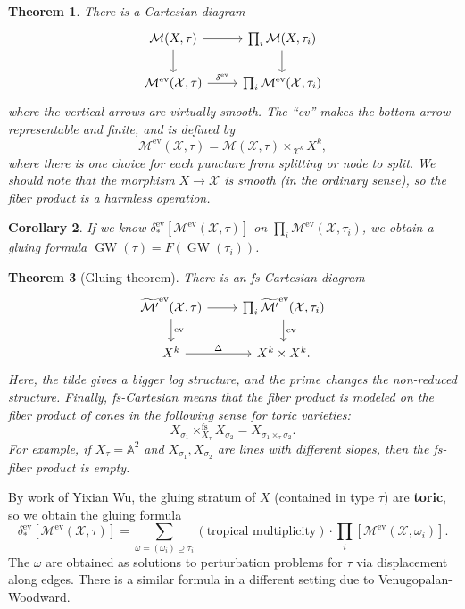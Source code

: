 \documentclass[leqno, openany]{memoir}
\newtheorem{thm}{Theorem}[section]
\newtheorem{cor}[thm]{Corollary}
\theoremstyle{definition}
\theoremstyle{remark}
\theoremstyle{plain}
\theoremstyle{definition}
\theoremstyle{remark}
\newcommand{\A}{\mathbb{A}}
\newcommand{\mc}[1]{\mathcal{#1}}
\newcommand{\mr}[1]{\mathrm{#1}}
\newcommand{\on}[1]{\operatorname{#1}}
\newcommand{\wt}[1]{\widetilde{#1}}
\begin{document}
\begin{thm}
  There is a Cartesian diagram
  \begin{equation*}
    \begin{tikzcd}
      \mc{M}(X, \tau) \ar{r} \ar{d} & \prod_i \mc{M}(X, \tau_i) \ar{d} \\
      \mc{M}^{\mr{ev}}(\mc{X}, \tau) \ar{r}{\delta^{\mr{ev}}} & \prod_i \mc{M}^{\mr{ev}}(\mc{X}, \tau_i)
    \end{tikzcd}
  \end{equation*}
  where the vertical arrows are virtually smooth. The ``ev'' makes the bottom arrow representable and finite, and is defined by
  \[ \mc{M}^{\mr{ev}}(\mc{X}, \tau) = \mc{M}(\mc{X}, \tau) \times_{\mc{X}^k} X^k, \]
  where there is one choice for each puncture from splitting or node to split. We should note that the morphism $X \to \mc{X}$ is smooth (in the ordinary sense), so the fiber product is a harmless operation.
\end{thm}

\begin{cor}
If we know $\delta^{\mr{ev}}_* [\mc{M}^{\mr{ev}}(\mc{X}, \tau)]$ on $\prod_i \mc{M}^{\mr{ev}}(\mc{X}, \tau_i)$, we obtain a gluing formula $\on{GW}(\tau) = F(\on{GW}(\tau_i))$.
\end{cor}

\begin{thm}[Gluing theorem]
  There is an fs-Cartesian diagram
  \begin{equation*}
    \begin{tikzcd}
      \wt{\mc{M}'}^{\mr{ev}}(\mc{X}, \tau) \ar{r} \ar{d}{\mr{ev}} & \prod_i \wt{\mc{M}'}^{\mr{ev}}(\mc{X}, \tau_i) \ar{d}{\mr{ev}} \\
      X^k \ar{r}{\Delta} & X^k \times X^k.
    \end{tikzcd}
  \end{equation*}
  Here, the tilde gives a bigger log structure, and the prime changes the non-reduced structure. Finally, fs-Cartesian means that the fiber product is modeled on the fiber product of cones in the following sense for toric varieties:
  \[ X_{\sigma_1} \times^{\mr{fs}}_{X_{\tau}} X_{\sigma_2} = X_{\sigma_1 \times_{\tau} \sigma_2}. \]
  For example, if $X_{\tau} = \A^2$ and $X_{\sigma_1}, X_{\sigma_2}$ are lines with different slopes, then the fs-fiber product is empty.
\end{thm}

By work of Yixian Wu, the gluing stratum of $X$ (contained in type $\tau$) are \textbf{toric}, so we obtain the gluing formula
\[ \delta_*^{\mr{ev}}[\mc{M}^{\mr{ev}}(\mc{X}, \tau)] = \sum_{\omega = (\omega_i) \supseteq \tau_i} (\text{tropical multiplicity}) \cdot \prod_i [\mc{M}^{\mr{ev}}(\mc{X}, \omega_i)]. \]
The $\omega$ are obtained as solutions to perturbation problems for $\tau$ via displacement along edges. There is a similar formula in a different setting due to Venugopalan-Woodward.
\end{document}
